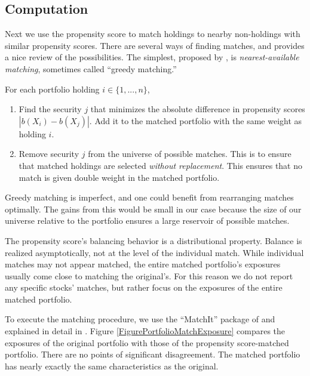 \documentclass{article}\usepackage{graphicx, color}
\begin{document}
\subsection{Computation}

Next we use the propensity score to match holdings to nearby
non-holdings with similar propensity scores. There are several ways of
finding matches, and \cite{abadie06} provides a nice review of the
possibilities. The simplest, proposed by \cite{cochran73}, is
\emph{nearest-available matching}, sometimes called ``greedy
matching.''

For each portfolio holding $i \in \{1, ..., n\}$,
\begin{enumerate}
\item Find the security $j$ that minimizes the absolute difference in
  propensity scores $|b(X_i) - b(X_j)|$. Add it to the matched
  portfolio with the same weight as holding $i$.
\item Remove security $j$ from the universe of possible matches. This
  is to ensure that matched holdings are selected \emph{without
  replacement}. This ensures that no match is given double weight in
  the matched portfolio.
\end{enumerate}

Greedy matching is imperfect, and one could benefit from
rearranging matches optimally. The gains from this would be small in
our case because the size of our universe relative to the
portfolio ensures a large reservoir of possible matches.

The propensity score's balancing behavior is a distributional
property. Balance is realized asymptotically, not at
the level of the individual match. While individual matches may not
appear matched, the entire matched portfolio's exposures usually come
close to matching the original's. For this reason we do not report any
specific stocks' matches, but rather focus on the exposures of the
entire matched portfolio.

To execute the matching procedure, we use the ``MatchIt'' package of
\cite{matchit.pkg} and explained in detail in
\cite{matchit.paper}. Figure \ref{FigurePortfolioMatchExposure}
compares the exposures of the original portfolio with those of the
propensity score-matched portfolio. There are no points of significant
disagreement. The matched portfolio has nearly exactly the same
characteristics as the original.
\end{document}
